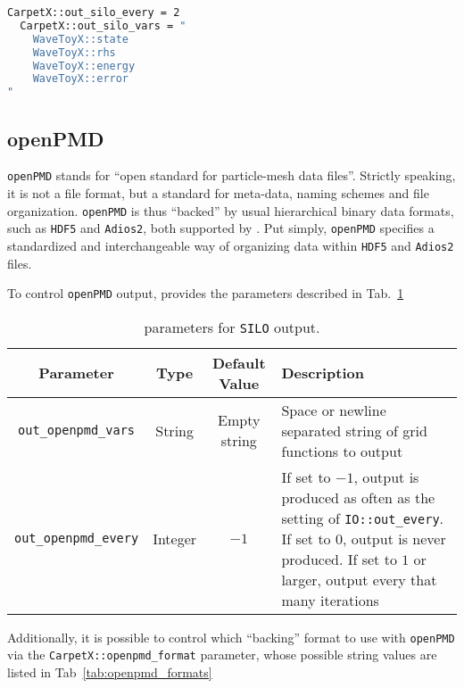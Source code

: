 \begin{lstlisting}[language=bash]
  CarpetX::out_silo_every = 2
  CarpetX::out_silo_vars = "
    WaveToyX::state
    WaveToyX::rhs
    WaveToyX::energy
    WaveToyX::error
"
\end{lstlisting}

\subsection{openPMD}
\label{sec:openpmd}

\texttt{openPMD} stands for ``open standard for particle-mesh data files''. Strictly speaking, it is not a file format, but a standard for meta-data, naming schemes and file organization. \texttt{openPMD} is thus ``backed'' by usual hierarchical binary data formats, such as \texttt{HDF5} and \texttt{Adios2}, both supported by \CarpetX. Put simply, \texttt{openPMD} specifies a standardized and interchangeable way of organizing data within \texttt{HDF5} and \texttt{Adios2} files.

To control \texttt{openPMD} output, \CarpetX\space provides the parameters described in Tab.~\ref{tab:openpmd_params}

\begin{table}[ht]
  \centering
  \begin{tabularx}{\textwidth}{cccX}
    Parameter                 & Type    & Default Value  & Description \\\hline\hline
    \texttt{out\_openpmd\_vars}  & String  & Empty string   & Space or newline separated string of grid functions to output \\
    \texttt{out\_openpmd\_every} & Integer & $-1$           & If set to $-1$, output is produced as often as the setting of \texttt{IO::out\_every}. If set to $0$, output is never produced. If set to $1$ or larger, output every that many iterations \\\hline\hline
  \end{tabularx}
  \label{tab:openpmd_params}
  \caption{\CarpetX\space parameters for \texttt{SILO} output.}
\end{table}

Additionally, it is possible to control which ``backing'' format to use with \texttt{openPMD} via the \texttt{CarpetX::openpmd\_format} parameter, whose possible string values are listed in Tab~\ref{tab:openpmd_formats}

